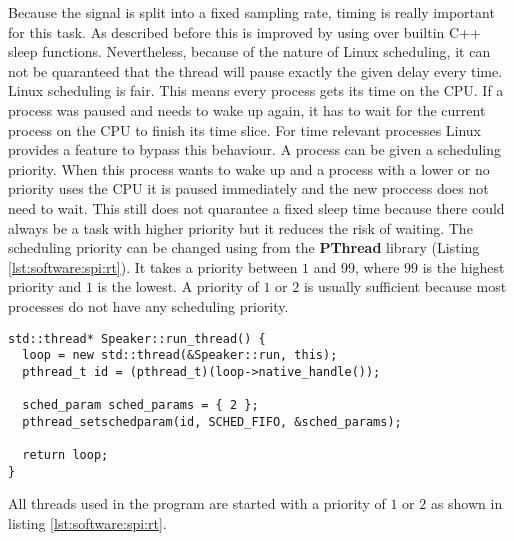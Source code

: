 Because the signal is split into a fixed sampling rate, timing is really important for this task. As described before this is improved by using  over builtin C++ sleep functions. Nevertheless, because of the nature of Linux scheduling, it can not be quaranteed that the thread will pause exactly the given delay every time. Linux scheduling is fair. This means every process gets its time on the CPU. If a process was paused and needs to wake up again, it has to wait for the current process on the CPU to finish its time slice. For time relevant processes Linux provides a feature to bypass this behaviour. A process can be given a scheduling priority. When this process wants to wake up and a process with a lower or no priority uses the CPU it is paused immediately and the new proccess does not need to wait. This still does not quarantee a fixed sleep time because there could always be a task with higher priority but it reduces the risk of waiting.\cite{faschingbauer_realtime_nodate}\p
%
The scheduling priority can be changed using  from the \textbf{PThread} library (Listing \ref{lst:software:spi:rt}). It takes a priority between $1$ and $99$, where $99$ is the highest priority and $1$ is the lowest. A priority of $1$ or $2$ is usually sufficient because most processes do not have any scheduling priority.\cite{noauthor_pthread_setschedparam3_nodate}
%
\begin{mdframed}
\begin{lstlisting}[caption=Example for creating a thread with realtime priority, label=lst:software:spi:rt]
std::thread* Speaker::run_thread() {
  loop = new std::thread(&Speaker::run, this);
  pthread_t id = (pthread_t)(loop->native_handle());

  sched_param sched_params = { 2 };
  pthread_setschedparam(id, SCHED_FIFO, &sched_params);

  return loop;
}
\end{lstlisting}
\end{mdframed}
%
All threads used in the program are started with a priority of $1$ or $2$ as shown in listing \ref{lst:software:spi:rt}.